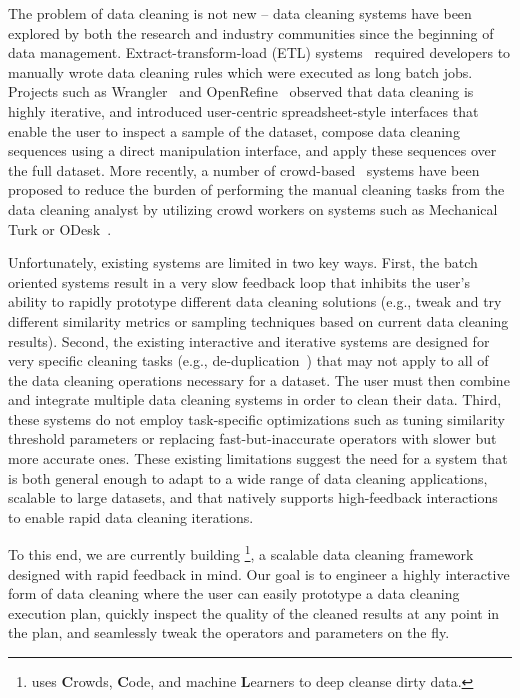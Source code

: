 The problem of data cleaning is not new -- data cleaning systems have been
explored by both the research and industry communities since the beginning of data management.
Extract-transform-load (ETL) systems~\cite{informatica,talend,nadeef,apachefalcon}
required developers to manually wrote data cleaning rules which were executed as 
long batch jobs.
Projects such as Wrangler~\cite{wrangler,trifacta} and
OpenRefine~\cite{openrefine} observed that data cleaning is highly iterative, and
introduced user-centric spreadsheet-style interfaces that enable the user to inspect a sample of the dataset, 
compose data cleaning sequences using a direct manipulation interface, and apply these sequences over the full dataset.   
More recently, a number of crowd-based~\cite{gokhale2014corleone,stonebraker2013data}
systems have been proposed to reduce the burden of performing the manual cleaning tasks from the data cleaning analyst 
by utilizing crowd workers on systems such as Mechanical Turk or ODesk~\cite{argonaut}.

Unfortunately, existing systems are limited in two key ways.
First, the batch oriented systems result in a very slow feedback loop 
that inhibits the user's ability to rapidly prototype different data cleaning solutions (e.g., tweak and 
try different similarity metrics or sampling techniques based on current data cleaning results).
Second, the existing interactive and iterative systems are designed for very specific cleaning tasks 
(e.g., de-duplication~\cite{gokhale2014corleone,park2014crowdfill,eracer,chen2014integrating}) that may not apply to all of the data 
cleaning operations necessary for a dataset.  The user must then combine and integrate multiple
data cleaning systems in order to clean their data.
Third, these systems do not employ task-specific optimizations
such as tuning similarity threshold parameters or replacing fast-but-inaccurate operators with slower but more accurate ones.
These existing limitations suggest the need for a system that is both general enough to
adapt to a wide range of data cleaning applications, scalable to large datasets, 
and that natively supports high-feedback interactions to enable rapid data cleaning iterations.

To this end, we are currently building \sys\footnote{{\scriptsize \sys uses {\bf C}rowds, {\bf C}ode, and machine {\bf L}earners to deep cleanse dirty data.}}, 
a scalable data cleaning
framework designed with rapid feedback in mind.  Our goal is to
engineer a highly interactive form of data cleaning where the user can easily prototype a data cleaning execution plan,
quickly inspect the quality of the cleaned results at any point in the plan, and seamlessly
tweak the operators and parameters on the fly.

